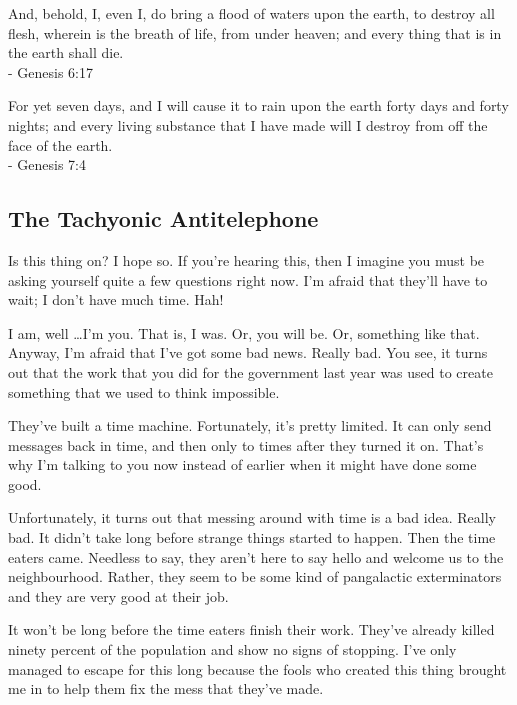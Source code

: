 \documentclass[12pt, a5paper, parskip=half-]{scrartcl}
\begin{document}
And, behold, I, even I, do bring a flood of waters upon the earth, to destroy all flesh, wherein is the breath of life, from under heaven; and every thing that is in the earth shall die. \\
\vspace{0.5ex}\hspace{8cm} - Genesis 6:17

For yet seven days, and I will cause it to rain upon the earth forty days and forty nights; and every living substance that I have made will I destroy from off the face of the earth.\\
\vspace{0.5ex}\hspace{8cm} - Genesis 7:4

\newpage

\subsection*{The Tachyonic Antitelephone} \label{subsection:the-tachyonic-antitelephone}
Is this thing on? I hope so.  If you're hearing this, then I imagine you must be asking yourself quite a few questions right now. I'm afraid that they'll have to wait; I don't have much time. Hah!

I am, well \ldots I'm you.  That is, I was. Or, you will be.  Or, something like that. Anyway, I'm afraid that I've got some bad news. Really bad. You see, it turns out that the work that you did for the government last year was used to create something that we used to think impossible.

They've built a time machine.  Fortunately, it's pretty limited.  It can only send messages back in time, and then only to times after they turned it on.  That's why I'm talking to you now instead of earlier when it might have done some good.

Unfortunately, it turns out that messing around with time is a bad idea. Really bad. It didn't take long before strange things started to happen. Then the time eaters came.  Needless to say, they aren't here to say hello and welcome us to the neighbourhood. 
Rather, they seem to be some kind of pangalactic exterminators and they are very good at their job.

It won't be long before the time eaters finish their work.
They've already killed ninety percent of the population and show no signs of stopping.
I've only managed to escape for this long because the fools who created this thing brought me in to help them fix the mess that they've made.  
\end{document}
